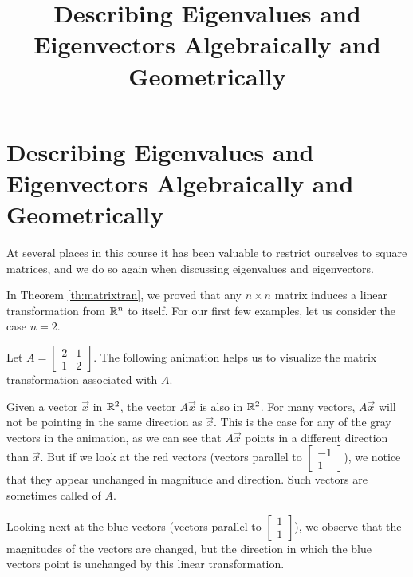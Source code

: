 \documentclass{ximera}
\title{Describing Eigenvalues and Eigenvectors Algebraically and Geometrically} \license{CC BY-NC-SA 4.0}
\begin{document}
\begin{abstract}

\end{abstract}
\maketitle
\section*{Describing Eigenvalues and Eigenvectors Algebraically and Geometrically}
At several places in this course it has been valuable to restrict ourselves to square matrices, and we do so again when discussing eigenvalues and eigenvectors.  

In Theorem \ref{th:matrixtran}, we proved that any $n \times n$  matrix induces a linear transformation from $\mathbb{R}^n$ to itself.  For our first few examples, let us consider the case $n = 2$. 

\begin{exploration}\label{init:eignintro}
Let $A=\begin{bmatrix} 2& 1\\ 1&2
\end{bmatrix}$.  The following animation helps us to visualize the matrix transformation associated with $A$.

\begin{center}
  \end{center}

Given a vector $\vec{x}$ in $\mathbb{R}^2$, the vector $A\vec{x}$ is also in $\mathbb{R}^2$.  For many vectors, $A\vec{x}$ will not be pointing in the same direction as $\vec{x}$.  This is the case for any of the gray vectors in the animation, as we can see that $A\vec{x}$ points in a different direction than $\vec{x}$.  But if we look at the red vectors (vectors parallel to $\begin{bmatrix}-1\\1\end{bmatrix}$), we notice that they appear unchanged in magnitude and direction.  Such vectors are sometimes called  of $A$.

Looking next at the blue vectors (vectors parallel to $\begin{bmatrix}1\\1\end{bmatrix}$), we observe that the magnitudes of the vectors are changed, but the direction in which the blue vectors point is unchanged by this linear transformation.  
\end{exploration}
\end{document}
